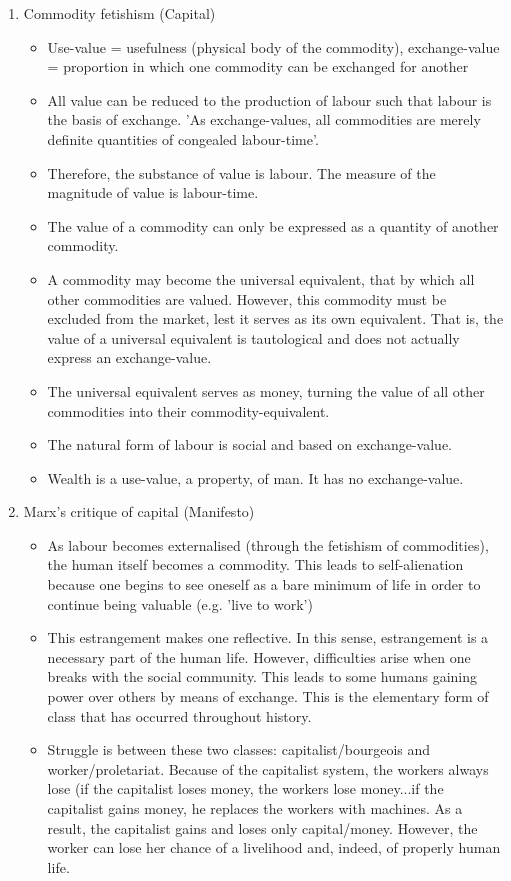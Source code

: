 \begin{enumerate}
\begin{itemize}
	\end{itemize}
 	\item Commodity fetishism (Capital)
	\begin{itemize}
		\item Use-value = usefulness (physical body of the commodity), exchange-value = proportion in which one commodity can be exchanged for another
		\item All value can be reduced to the production of labour such that labour is the basis of exchange. 'As exchange-values, all commodities are merely definite quantities of congealed labour-time'.
		\item Therefore, the substance of value is labour. The measure of the magnitude of value is labour-time.
		\item The value of a commodity can only be expressed as a quantity of another commodity.
		\item A commodity may become the universal equivalent, that by which all other commodities are valued. However, this commodity must be excluded from the market, lest it serves as its own equivalent. That is, the value of a universal equivalent is tautological and does not actually express an exchange-value.
		\item The universal equivalent serves as money, turning the value of all other commodities into their commodity-equivalent.
		\item The natural form of labour is social and based on exchange-value.
		\item Wealth is a use-value, a property, of man. It has no exchange-value.
	\end{itemize}
 	\item Marx's critique of capital (Manifesto)
	\begin{itemize}
		\item As labour becomes externalised (through the fetishism of commodities), the human itself becomes a commodity. This leads to self-alienation because one begins to see oneself as a bare minimum of life in order to continue being valuable (e.g. 'live to work')
		\item This estrangement makes one reflective. In this sense, estrangement is a necessary part of the human life. However, difficulties arise when one breaks with the social community. This leads to some humans gaining power over others by means of exchange. This is the elementary form of class that has occurred throughout history.
		\item Struggle is between these two classes: capitalist/bourgeois and worker/proletariat. Because of the capitalist system, the workers always lose (if the capitalist loses money, the workers lose money...if the capitalist gains money, he replaces the workers with machines. As a result, the capitalist gains and loses only capital/money. However, the worker can lose her chance of a livelihood and, indeed, of properly human life.

\end{itemize}
\end{enumerate}
